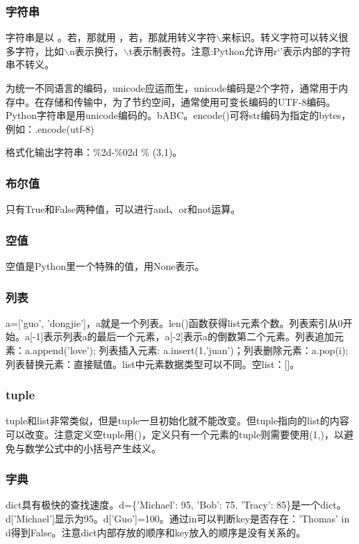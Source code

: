 \documentclass[12pt,a4paper]{article}
\begin{document}
\begin{CJK}{UTF8}{gbsn}
    \subsubsection{字符串}
    字符串是以\textquotesingle{} \textquotedbl{} 。若，那就用\textquotedbl{} ，若，那就用转义字符$\backslash$来标识。转义字符可以转义很多字符，比如$\backslash$n表示换行，$\backslash$t表示制表符。注意:Python允许用r`'表示内部的字符串不转义。

    为统一不同语言的编码，unicode应运而生，unicode编码是2个字符，通常用于内存中。在存储和传输中，为了节约空间，通常使用可变长编码的UTF-8编码。
    Python字符串是用unicode编码的。b\textquotesingle{}ABC。encode()可将str编码为指定的bytes，例如：\textquotesingle.encode(\textquotesingle{}utf-8\textquotesingle)

    格式化输出字符串：\textquotesingle\%2d-\%02d\textquotesingle{} \% (3,1)。
    \subsubsection{布尔值}
    只有True和False两种值，可以进行and、or和not运算。
    \subsubsection{空值}
    空值是Python里一个特殊的值，用None表示。
    \subsubsection{列表}
    a=['guo', 'dongjie']，a就是一个列表。len()函数获得list元素个数。列表索引从0开始。a[-1]表示列表a的最后一个元素，a[-2]表示a的倒数第二个元素。列表追加元素：a.append('love'); 列表插入元素: a.insert(1,'juan')；列表删除元素：a.pop(i);列表替换元素：直接赋值。list中元素数据类型可以不同。空list：[]。
    \subsubsection{tuple}
    tuple和list非常类似，但是tuple一旦初始化就不能改变。但tuple指向的list的内容可以改变。注意定义空tuple用()，定义只有一个元素的tuple则需要使用(1,)，以避免与数学公式中的小括号产生歧义。
    \subsubsection{字典}
    dict具有极快的查找速度。d=\{'Michael': 95, 'Bob': 75, 'Tracy': 85\}是一个dict。d['Michael']显示为95。d['Guo']=100。通过in可以判断key是否存在：'Thomas' in d得到False。注意dict内部存放的顺序和key放入的顺序是没有关系的。


\end{CJK}
\end{document}
